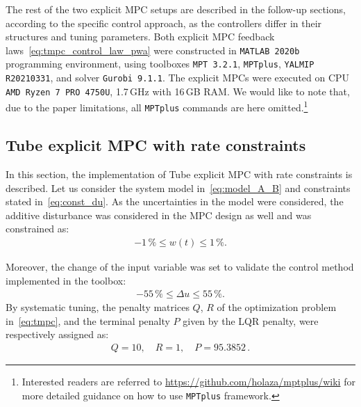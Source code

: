 \documentclass[letterpaper, 10 pt, conference]{ieeeconf}
\begin{document}
	The rest of the two explicit MPC setups are described in the follow-up sections, according to the specific control approach, as the controllers differ in their structures and tuning parameters. Both explicit MPC feedback laws~\eqref{eq:tmpc_control_law_pwa} were constructed in \texttt{MATLAB 2020b} programming environment, using toolboxes  \texttt{MPT 3.2.1}, \texttt{MPTplus}, \texttt{YALMIP R20210331},
	and solver \texttt{Gurobi 9.1.1}. The explicit MPCs were executed on
	CPU \texttt{AMD Ryzen 7 PRO 4750U}, 1.7\,GHz with 16\,GB RAM. 
	We would like to note that, due to the paper limitations, all \texttt{MPTplus} commands are here omitted.\footnote{Interested readers are referred to \url{https://github.com/holaza/mptplus/wiki} for more detailed guidance on how to use \texttt{MPTplus} framework.}
	
	
	
	\subsection{Tube explicit MPC with rate constraints}
	\label{sec:tube_exp}
	
	In this section, the implementation of Tube explicit MPC with rate constraints is described. Let us consider the system model in~\eqref{eq:model_A_B} and constraints stated in~\eqref{eq:const_du}. 
	As the uncertainties in the model were considered, the additive disturbance was considered in the MPC design as well and was constrained as:
	\begin{eqnarray}
		\label{eq:const_w}
		-1\,\% \le w(t) \le 1\,\%.
	\end{eqnarray}
	
	Moreover, the change of the input variable was set to validate the control method implemented in the toolbox:
	\begin{eqnarray}
		\label{eq:const_du}
		-55\,\% \le \Delta u \le 55\,\%.
	\end{eqnarray}
	By systematic tuning, the penalty matrices $Q$, $R$ of the optimization problem in~\eqref{eq:tmpc}, and the terminal penalty $P$ given by the LQR penalty, were respectively assigned as:
	\begin{eqnarray}
		\label{eq:setup_penalty}
		Q = 10, \quad R = 1, \quad P = 95.3852 \, .
	\end{eqnarray}
	
\end{document}

